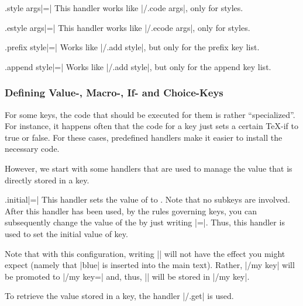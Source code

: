 \begin{handler}{{.style args}|=|}
    This handler works like |/.code args|, only for styles.
\end{handler}

\begin{handler}{{.estyle args}|=|}
    This handler works like |/.ecode args|, only for styles.
\end{handler}

\begin{handler}{{.prefix style}|=|}
    Works like |/.add style|, but only for the prefix key list.
\end{handler}

\begin{handler}{{.append style}|=|}
    Works like |/.add style|, but only for the append key list.
\end{handler}


\subsubsection{Defining Value-, Macro-, If- and Choice-Keys}

For some keys, the code that should be executed for them is rather
``specialized''. For instance, it happens often that the code for a key just
sets a certain \TeX-if to true or false. For these cases, predefined handlers
make it easier to install the necessary code.

However, we start with some handlers that are used to manage the value that is
directly stored in a key.

\begin{handler}{{.initial}|=|}
    This handler sets the value of  to . Note that no
    subkeys are involved. After this handler has been used, by the rules
    governing keys, you can subsequently change the value of the  by
    just writing |=|. Thus, this handler is used to set
    the initial value of key.
\begin{codeexample}
\end{codeexample}

    Note that with this configuration, writing || will not
    have the effect you might expect (namely that |blue| is inserted into the
    main text). Rather, |/my key| will be promoted to |/my key=\pgfkeysnovalue|
    and, thus, |\pgfkeysnovalue| will be stored in |/my key|.

    To retrieve the value stored in a key, the handler |/.get| is used.
\end{handler}

